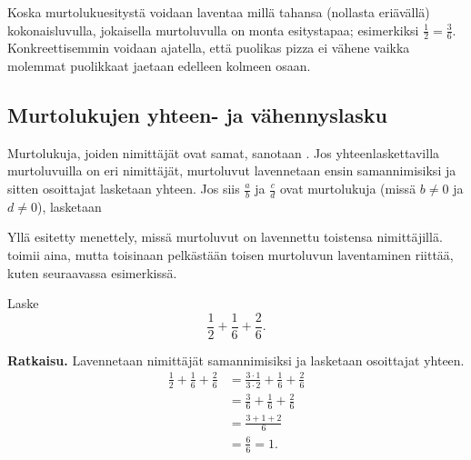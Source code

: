 Koska murtolukuesitystä voidaan laventaa millä tahansa (nollasta eriävällä) kokonaisluvulla, jokaisella murtoluvulla on monta esitystapaa; esimerkiksi $\frac{1}{2}=\frac{3}{6}$. Konkreettisemmin voidaan ajatella, että puolikas pizza ei vähene vaikka molemmat puolikkaat jaetaan edelleen kolmeen osaan.

\subsection*{Murtolukujen yhteen- ja vähennyslasku}


Murtolukuja, joiden nimittäjät ovat samat, sanotaan . Jos yhteenlaskettavilla murtoluvuilla on eri nimittäjät, murtoluvut lavennetaan ensin samannimisiksi ja sitten osoittajat lasketaan yhteen. Jos siis $\frac{a}{b}$ ja $\frac{c}{d}$ ovat murtolukuja (missä $b \neq 0$ ja $d \neq 0$), lasketaan

 
Yllä esitetty menettely, missä murtoluvut on lavennettu toistensa nimittäjillä. toimii aina, mutta toisinaan pelkästään toisen murtoluvun laventaminen riittää, kuten seuraavassa esimerkissä. 

\begin{esimerkki}
        Laske
        \[
        \frac{1}{2} + \frac{1}{6} + \frac{2}{6}.
        \]
        
        \textbf{Ratkaisu.}
        Lavennetaan nimittäjät samannimisiksi ja lasketaan osoittajat yhteen.
        \begin{align*}
            \frac{1}{2} + \frac{1}{6} + \frac{2}{6} &=\frac{3\cdot 1}{3\cdot 2} + \frac{1}{6} + \frac{2}{6}\\
            										&=\frac{3}{6} + \frac{1}{6} + \frac{2}{6}\\
           											&= \frac{3+1+2}{6}\\
           											&= \frac{6}{6} = 1.
        \end{align*}
    \end{esimerkki}
    

